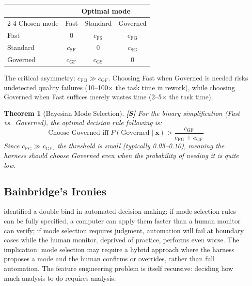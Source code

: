 \documentclass[11pt, a4paper, logo, copyright]{googledeepmind}
\newtheorem{theorem}{Theorem}[section]
\begin{document}
\begin{center}
\begin{tabular}{lccc}
\toprule
& \multicolumn{3}{c}{Optimal mode} \\
\cmidrule(l){2-4}
Chosen mode & Fast & Standard & Governed \\
\midrule
Fast & 0 & $c_{\mathrm{FS}}$ & $c_{\mathrm{FG}}$ \\
Standard & $c_{\mathrm{SF}}$ & 0 & $c_{\mathrm{SG}}$ \\
Governed & $c_{\mathrm{GF}}$ & $c_{\mathrm{GS}}$ & 0 \\
\bottomrule
\end{tabular}
\end{center}

The critical asymmetry: $c_{\mathrm{FG}} \gg c_{\mathrm{GF}}$. Choosing Fast when Governed is needed risks undetected quality failures (10--100$\times$ the task time in rework), while choosing Governed when Fast suffices merely wastes time (2--5$\times$ the task time).

\begin{theorem}[Bayesian Mode Selection]\label{thm:mode}
\textbf{[S]} For the binary simplification (Fast vs.\ Governed), the optimal decision rule following \citet{elkan2001foundations} is:
\[
    \text{Choose Governed iff } P(\text{Governed} \mid \mathbf{x}) > \frac{c_{\mathrm{GF}}}{c_{\mathrm{FG}} + c_{\mathrm{GF}}}
\]
Since $c_{\mathrm{FG}} \gg c_{\mathrm{GF}}$, the threshold is small (typically 0.05--0.10), meaning the harness should choose Governed even when the probability of needing it is quite low.
\end{theorem}

\subsection{Bainbridge's Ironies}

\citet{bainbridge1983ironies} identified a double bind in automated decision-making: if mode selection rules can be fully specified, a computer can apply them faster than a human monitor can verify; if mode selection requires judgment, automation will fail at boundary cases while the human monitor, deprived of practice, performs even worse. The implication: mode selection may require a hybrid approach where the harness proposes a mode and the human confirms or overrides, rather than full automation. The feature engineering problem is itself recursive: deciding how much analysis to do requires analysis.
\end{document}
